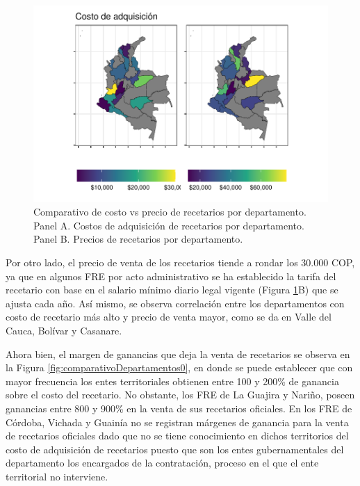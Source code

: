 \documentclass[
]{book}
\begin{document}
\begin{figure}

{\centering \includegraphics[width=0.9\linewidth]{InformeFinal_files/figure-latex/costoRecetario-1} 

}

\caption{Comparativo de costo vs precio de recetarios por departamento. Panel A. Costos de adquisición de recetarios por departamento. Panel B. Precios de recetarios por departamento.}\label{fig:costoRecetario}
\end{figure}

Por otro lado, el precio de venta de los recetarios tiende a rondar los 30.000 COP, ya que en algunos FRE por acto administrativo se ha establecido la tarifa del recetario con base en el salario mínimo diario legal vigente (Figura \ref{fig:costoRecetario}B) que se ajusta cada año. Así mismo, se observa correlación entre los departamentos con costo de recetario más alto y precio de venta mayor, como se da en Valle del Cauca, Bolívar y Casanare.

Ahora bien, el margen de ganancias que deja la venta de recetarios se observa en la Figura \ref{fig:comparativoDepartamentos0}, en donde se puede establecer que con mayor frecuencia los entes territoriales obtienen entre 100 y 200\% de ganancia sobre el costo del recetario. No obstante, los FRE de La Guajira y Nariño, poseen ganancias entre 800 y 900\% en la venta de sus recetarios oficiales. En los FRE de Córdoba, Vichada y Guainía no se registran márgenes de ganancia para la venta de recetarios oficiales dado que no se tiene conocimiento en dichos territorios del costo de adquisición de recetarios puesto que son los entes gubernamentales del departamento los encargados de la contratación, proceso en el que el ente territorial no interviene.
\end{document}
